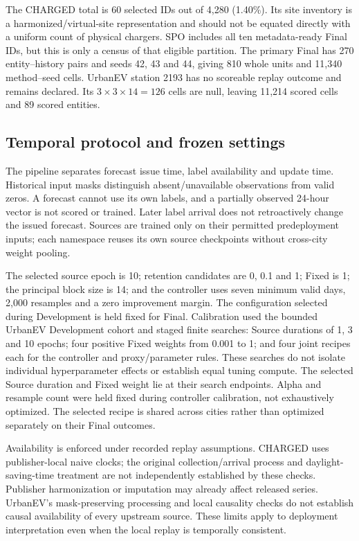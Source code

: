 \documentclass[pdflatex,iicol,sn-mathphys-num]{sn-jnl}
\begin{document}
The CHARGED total is 60 selected IDs out of 4,280 (1.40\%). Its site inventory is a harmonized/virtual-site representation and should not be equated directly with a uniform count of physical chargers. SPO includes all ten metadata-ready Final IDs, but this is only a census of that eligible partition. The primary Final has 270 entity--history pairs and seeds 42, 43 and 44, giving 810 whole units and 11,340 method--seed cells. UrbanEV station 2193 has no scoreable replay outcome and remains declared. Its $3\times3\times14=126$ cells are null, leaving 11,214 scored cells and 89 scored entities. 

\subsection{Temporal protocol and frozen settings}
The pipeline separates forecast issue time, label availability and update time. Historical input masks distinguish absent/unavailable observations from valid zeros. A forecast cannot use its own labels, and a partially observed 24-hour vector is not scored or trained. Later label arrival does not retroactively change the issued forecast. Sources are trained only on their permitted predeployment inputs; each namespace reuses its own source checkpoints without cross-city weight pooling.

The selected source epoch is 10; retention candidates are 0, 0.1 and 1; Fixed is 1; the principal block size is 14; and the controller uses seven minimum valid days, 2,000 resamples and a zero improvement margin. The configuration selected during Development is held fixed for Final. Calibration used the bounded UrbanEV Development cohort and staged finite searches: Source durations of 1, 3 and 10 epochs; four positive Fixed weights from 0.001 to 1; and four joint recipes each for the controller and proxy/parameter rules. These searches do not isolate individual hyperparameter effects or establish equal tuning compute. The selected Source duration and Fixed weight lie at their search endpoints. Alpha and resample count were held fixed during controller calibration, not exhaustively optimized. The selected recipe is shared across cities rather than optimized separately on their Final outcomes.

Availability is enforced under recorded replay assumptions. CHARGED uses publisher-local naive clocks; the original collection/arrival process and daylight-saving-time treatment are not independently established by these checks. Publisher harmonization or imputation may already affect released series. UrbanEV's mask-preserving processing and local causality checks do not establish causal availability of every upstream source. These limits apply to deployment interpretation even when the local replay is temporally consistent.
\end{document}
